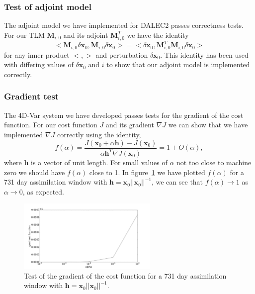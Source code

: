\documentclass[11pt]{article}
\begin{document}
\subsubsection{Test of adjoint model} 

The adjoint model we have implemented for DALEC2 passes correctness tests. For our TLM $\mathbf{M}_{i,0}$ and its adjoint $\mathbf{M}_{i,0}^{T}$ we have the identity
\begin{equation}
<\mathbf{M}_{i,0}\delta\textbf{x}_0, \mathbf{M}_{i,0}\delta\textbf{x}_0> = <\delta\textbf{x}_0, \mathbf{M}_{i,0}^{T}\mathbf{M}_{i,0}\delta\textbf{x}_0>
\end{equation}
for any inner product $<, >$ and perturbation $\delta \textbf{x}_0$. This identity has been used with differing values of $\delta \textbf{x}_0$ and $i$ to show that our adjoint model is implemented correctly.

\subsubsection{Gradient test} \label{sec:testgrad}

The 4D-Var system we have developed passes tests for the gradient of the cost function. For our cost function $J$ and its gradient $\nabla J$ we can show that we have implemented $\nabla J$ correctly using the identity,
\begin{equation}
f(\alpha)=\frac{J( \textbf{x}_0 + \alpha \textbf{h}) - J(\textbf{x}_0)}{\alpha \textbf{h}^{T} \nabla J(\textbf{x}_0)} = 1 + O(\alpha),
\end{equation}
where $\textbf{h}$ is a vector of unit length. For small values of $\alpha$ not too close to machine zero we should have $f(\alpha)$ close to 1. In figure~\ref{fig:testgradcostone} we have plotted $f(\alpha)$ for a 731 day assimilation window with $\textbf{h}=\textbf{x}_0||\textbf{x}_0||^{-1}$, we can see that $f(\alpha) \rightarrow 1$ as $\alpha \rightarrow 0$, as expected.

\begin{figure}[ht]
    \centering
    \includegraphics[width=0.6\textwidth]{gradtestone.png}
    \caption{Test of the gradient of the cost function for a 731 day assimilation window with $\textbf{h}=\textbf{x}_0||\textbf{x}_0||^{-1}$.}
    \label{fig:testgradcostone}
\end{figure}
\end{document}
